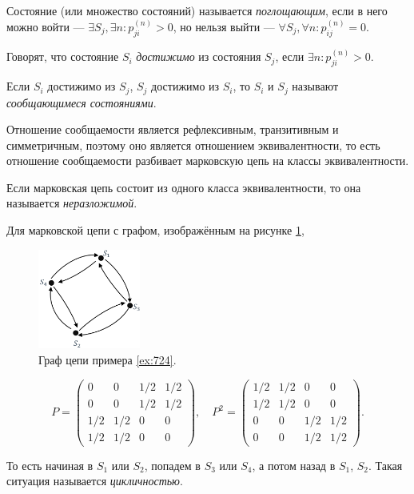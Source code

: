 \begin{definition}
  Состояние (или множество состояний) называется \emph{поглощающим}, если в него
  можно войти ---
  $\exists S_j , \exists n\colon p_{ji}^{(n)} > 0$,
  но нельзя выйти ---
  $\forall S_j, \forall n \colon p_{ij}^{(n)} = 0$.
\end{definition}

\begin{definition}
  Говорят, что состояние $S_i$ \emph{достижимо} из состояния $S_j$, если $\exists n\colon p_{ji}^{(n)} > 0$.
\end{definition}

\begin{definition}
  Если $S_i$ достижимо из $S_j$, $S_j$ достижимо из $S_i$, то $S_i$ и $S_j$
  называют \emph{сообщающимеся
  состояниями}.
\end{definition}

Отношение сообщаемости является рефлексивным, транзитивным и симметричным, поэтому оно является 
отношением эквивалентности, то есть отношение сообщаемости разбивает марковскую цепь на классы эквивалентности.

\begin{definition}
  Если марковская цепь состоит из одного класса эквивалентности, то она называется
  \emph{неразложимой}.
\end{definition}

\begin{ex}\label{ex:724}
  Для марковской цепи с графом, изображённым на рисунке \ref{fig:ex4},
  \begin{figure}[h!]
    \centering
    \includegraphics[width=0.3\textwidth]{stoproc/Figures/lec2-ex4.png}
    \caption{Граф цепи примера \ref{ex:724}.}
    \label{fig:ex4}
  \end{figure}
  \[
    P = \begin{pmatrix}
      0 & 0 & 1/2 & 1/2 \\
      0 & 0 & 1/2 & 1/2 \\
      1/2 & 1/2 & 0 & 0 \\
      1/2 & 1/2 & 0 & 0
    \end{pmatrix}, \quad
    P^2 = \begin{pmatrix}
      1/2 & 1/2 & 0 & 0 \\
      1/2 & 1/2 & 0 & 0 \\
      0 & 0 & 1/2 & 1/2 \\
      0 & 0 & 1/2 & 1/2
    \end{pmatrix}.
  \]

  То есть начиная в $S_1$ или $S_2$, попадем в $S_3$ или $S_4$, а потом назад в $S_1$, $S_2$.
Такая ситуация называется \emph{цикличностью}.
\end{ex}

